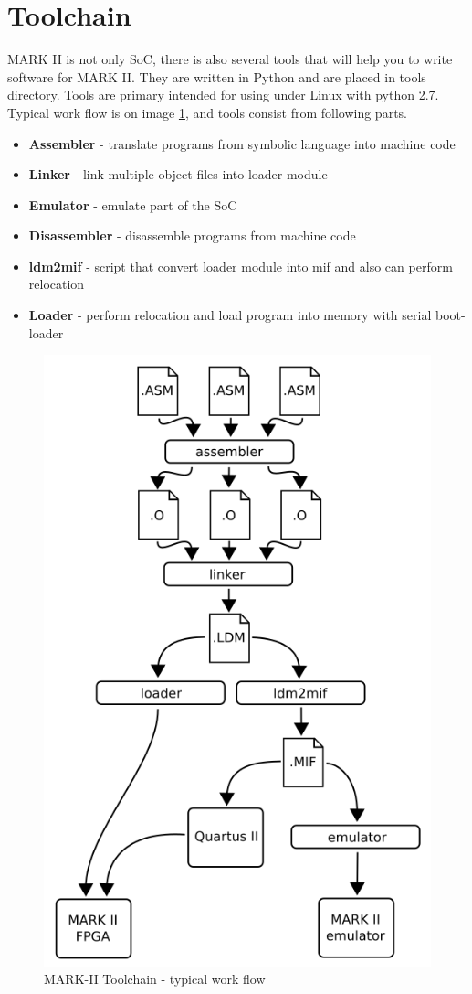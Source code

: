 \section{Toolchain}

MARK II is not only SoC, there is also several tools that will help you to
write software for MARK II. They are written in Python and are placed in tools
directory. Tools are primary intended for using under Linux with python 2.7.
Typical work flow is on image \ref{fig:toolchain_workflow}, and tools consist
from following parts.

\begin{itemize}
    \item \textbf{Assembler} - translate programs from symbolic language into machine code
    \item \textbf{Linker} - link multiple object files into loader module
    \item \textbf{Emulator} - emulate part of the SoC
    \item \textbf{Disassembler} - disassemble programs from machine code
    \item \textbf{ldm2mif} - script that convert loader module into mif and also can perform relocation
    \item \textbf{Loader} - perform relocation and load program into memory with serial boot-loader
\end{itemize}

\begin{figure}[]
    \centering
    \includegraphics[width=.7\textwidth]{img/toolworkflow.png}
    \caption{MARK-II Toolchain - typical work flow}
    \label{fig:toolchain_workflow}
\end{figure}
